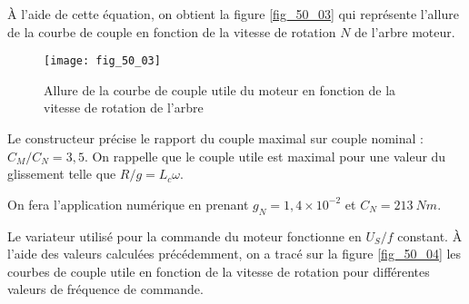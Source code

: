 \ifprof
\else
\fi

À l’aide de cette équation, on obtient la figure \autoref{fig_50_03} qui représente l’allure de la courbe de
couple en fonction de la vitesse de rotation $N$ de l’arbre moteur.

\begin{figure}[H]
\centering
\texttt{[image: fig\_50\_03]}
\caption{Allure de la courbe de couple utile du moteur en fonction de la vitesse de
rotation de l’arbre \label{fig_50_03}}
\end{figure}

\ifprof
\else
\fi


Le constructeur précise le rapport du couple maximal sur couple nominal : $C_M/C_N = 3,5$.
On rappelle que le couple utile est maximal pour une valeur du glissement telle que
$R/g = L_c\omega$.

\ifprof
\else
\fi

\ifprof
\else
\fi

\begin{rem}
On fera l’application numérique en prenant $g_N = 1,4 \times 10^{-2}$ et $C_N =\SI{213}{Nm}$.
\end{rem}

Le variateur utilisé pour la commande du moteur fonctionne en $U_S/f$ constant. À l’aide
des valeurs calculées précédemment, on a tracé sur la figure \autoref{fig_50_04}  les courbes de couple utile
en fonction de la vitesse de rotation pour différentes valeurs de fréquence de commande.

